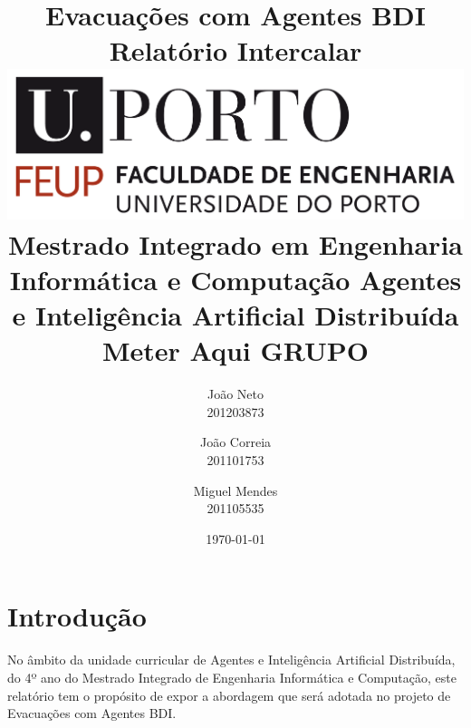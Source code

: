 \documentclass[a4paper,11pt]{article}
\begin{document}
\title{\Huge\textbf{Evacuações com Agentes BDI}\linebreak\linebreak\linebreak
\Large\textbf{Relatório Intercalar}\linebreak\linebreak
\linebreak\linebreak
\includegraphics[scale=0.1]{feup-logo.png}\linebreak\linebreak
\linebreak\linebreak
\Large{Mestrado Integrado em Engenharia Informática e Computação} \linebreak\linebreak
\Large{Agentes e Inteligência Artificial Distribuída}\linebreak\linebreak
\Large{Meter Aqui GRUPO}}
\author{
João Neto \\ 201203873 \\
\and
João Correia\\ 201101753 \\
\and
Miguel Mendes\\ 201105535 \\}
\date{\today}

\maketitle

\newpage

\tableofcontents

\newpage
\section{Introdução}
No âmbito da unidade curricular de Agentes e Inteligência Artificial Distribuída, do 4º ano do Mestrado Integrado de Engenharia Informática e Computação, este relatório tem o propósito de expor a abordagem que será adotada no projeto de Evacuações com Agentes BDI.
\end{document}
